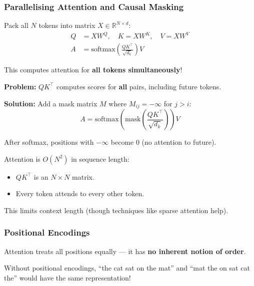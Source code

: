 \bigseparator

\subsubsection{Parallelising Attention and Causal Masking}

\begin{defbox}
Pack all $N$ tokens into matrix $X \in \mathbb{R}^{N \times d}$:
\begin{align*}
Q &= X W^Q, \quad K = X W^K, \quad V = X W^V \\
A &= \text{softmax}\left(\frac{Q K^\top}{\sqrt{d_k}}\right) V
\end{align*}

This computes attention for \textbf{all tokens simultaneously}!
\end{defbox}

\begin{defbox}
\textbf{Problem:} $QK^\top$ computes scores for \textbf{all} pairs, including future tokens.

\textbf{Solution:} Add a mask matrix $M$ where $M_{ij} = -\infty$ for $j > i$:
\[
A = \text{softmax}\left(\text{mask}\left(\frac{Q K^\top}{\sqrt{d_k}}\right)\right) V
\]

After softmax, positions with $-\infty$ become 0 (no attention to future).
\end{defbox}

\begin{tipbox}
Attention is \textbf{$O(N^2)$} in sequence length:
\begin{itemize}
  \item $QK^\top$ is an $N \times N$ matrix.
  \item Every token attends to every other token.
\end{itemize}

This limits context length (though techniques like sparse attention help).
\end{tipbox}

\bigseparator

\subsubsection{Positional Encodings}

\begin{tipbox}
Attention treats all positions equally --- it has \textbf{no inherent notion of order}.

Without positional encodings, ``the cat sat on the mat'' and ``mat the on sat cat the'' would have the same representation!
\end{tipbox}

